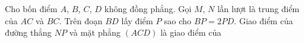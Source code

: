 \begin{ex}
Cho bốn điểm $A$, $B$, $C$, $D$ không đồng phẳng. Gọi $M$, $N$ lần lượt là trung điểm của $AC$ và $BC$. Trên đoạn $BD$ lấy điểm $P$ sao cho $BP=2PD$. Giao điểm của đường thẳng $NP$ và mặt phẳng $(ACD)$ là giao điểm của
\end{ex}
